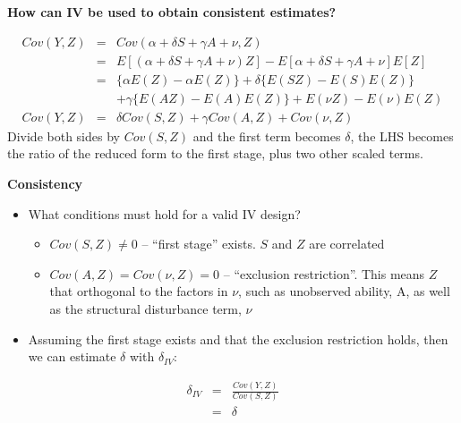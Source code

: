 \documentclass[notes=show]{beamer}
\begin{document}
\begin{frame}[plain]

	\begin{center}
	\textbf{How can IV be used to obtain consistent estimates?}
	\end{center}
	
		\begin{eqnarray*}
		Cov(Y,Z) 	&=& Cov(\alpha + \delta{S} + \gamma{A} + \nu, Z) \\
				&=&	E[(\alpha + \delta{S} + \gamma{A} + \nu)  Z] - E[\alpha + \delta{S} + \gamma{A} + \nu]E[Z] \\
				&=& \{\alpha E(Z) - \alpha E(Z) \} + \delta \{ E(SZ) - E(S)E(Z)\} \\
				&& + \gamma \{E(AZ) - E(A)E(Z) \} + E(\nu Z) - E(\nu)E(Z) \\
		Cov(Y,Z)	&=& \delta Cov(S,Z) + \gamma Cov(A,Z) + Cov(\nu,Z)
		\end{eqnarray*}
		Divide both sides by $Cov(S,Z)$ and the first term becomes $\delta$, the LHS becomes the ratio of the reduced form to the first stage, plus two other scaled terms.
\end{frame}

\begin{frame}[plain]
\begin{center}
\textbf{Consistency}
\end{center}

	\begin{itemize}
	\item What conditions must hold for a valid IV design?
		\begin{itemize}
		\item  $Cov(S,Z)\neq{0}$ -- ``first stage'' exists.  $S$ and $Z$ are correlated 
		\item $Cov(A,Z)=Cov(\nu ,Z)=0$ -- ``exclusion restriction''.  This means $Z$ that orthogonal to the factors in $\nu$, such as unobserved ability, A, as well as the structural disturbance term, $\nu$
		\end{itemize}
	\item Assuming the first stage exists and that the exclusion restriction holds, then we can estimate $\delta$ with $\delta_{IV}$:
	\end{itemize}
	\begin{eqnarray*}
	\delta_{IV} &=& \frac{Cov(Y,Z)}{Cov(S,Z)} \\ 
	&=&\delta
	\end{eqnarray*}
\end{frame}
\end{document}
